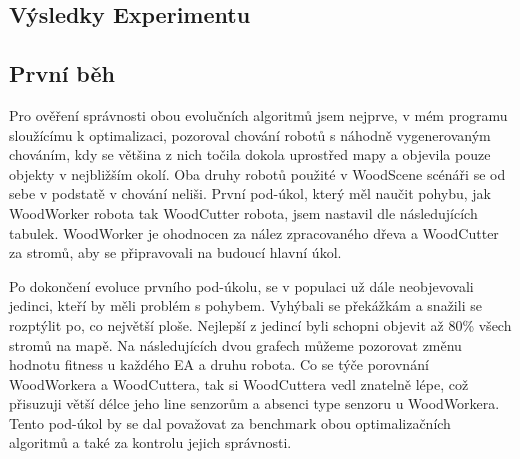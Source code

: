 \subsection{Výsledky Experimentu}
\subsection{První běh}
Pro ověření správnosti obou evolučních algoritmů jsem nejprve, v mém programu sloužícímu k optimalizaci, pozoroval chování robotů s náhodně vygenerovaným chováním, kdy se většina z nich točila dokola uprostřed mapy a objevila pouze objekty v nejbližším okolí. Oba druhy robotů použité v WoodScene scénáři se od sebe v podstatě v chování neliši. První pod-úkol, který měl naučit pohybu, jak WoodWorker robota tak WoodCutter robota, jsem nastavil dle následujících tabulek. WoodWorker je ohodnocen za nález zpracovaného dřeva a WoodCutter za stromů, aby se připravovali na budoucí hlavní úkol.\par
{} \par
{} \par
\par
Po dokončení evoluce prvního pod-úkolu, se v populaci už dále neobjevovali jedinci, kteří by měli problém s pohybem. Vyhýbali se překážkám a snažili se rozptýlit po, co největší ploše. Nejlepší z jedincí byli schopni objevit až 80\% všech stromů na mapě. Na následujících dvou grafech můžeme pozorovat změnu hodnotu fitness u každého EA a druhu robota. Co se týče porovnání WoodWorkera a WoodCuttera, tak si WoodCuttera vedl znatelně lépe, což přisuzuji větší délce jeho line senzorům a absenci type senzoru u WoodWorkera. Tento pod-úkol by se dal považovat za benchmark obou optimalizačních algoritmů a také za kontrolu jejich správnosti. 


